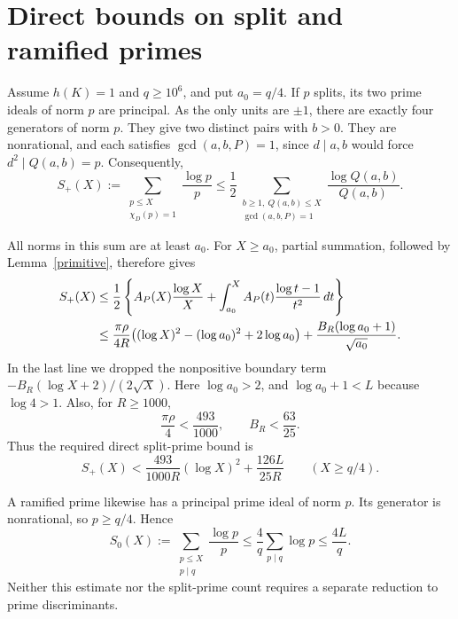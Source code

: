 \documentclass[11pt]{article}
\begin{document}
\section{Direct bounds on split and ramified primes}

Assume \(h(K)=1\) and \(q\ge10^6\), and put \(a_0=q/4\).
If \(p\) splits, its two prime ideals of norm \(p\) are principal.
As the only units are \(\pm1\), there are exactly four generators
of norm \(p\). They give two distinct pairs with \(b>0\).
They are nonrational, and each satisfies \(\gcd(a,b,P)=1\), since
\(d\mid a,b\) would force \(d^2\mid Q(a,b)=p\).
Consequently,
\begin{equation}\label{split-count}
 S_+(X):=\sum_{\substack{p\le X\\\chi_D(p)=1}}\frac{\log p}{p}
 \le\frac12\sum_{\substack{b\ge1,\ Q(a,b)\le X\\\gcd(a,b,P)=1}}
                        \frac{\log Q(a,b)}{Q(a,b)}.
\end{equation}

All norms in this sum are at least \(a_0\). For \(X\ge a_0\),
partial summation, followed by Lemma~\ref{primitive}, therefore gives
\begin{align}
 S_+(X)
 &\le\frac12\left\{
 A_P(X)\frac{\log X}{X}
 +\int_{a_0}^X A_P(t)\frac{\log t-1}{t^2}\,dt\right\} \notag\\
 &\le\frac{\pi\rho}{4R}
       \bigl((\log X)^2-(\log a_0)^2+2\log a_0\bigr)
   +\frac{B_R(\log a_0+1)}{\sqrt{a_0}}.\label{split-precise}
\end{align}
In the last line we dropped the nonpositive boundary term
\(-B_R(\log X+2)/(2\sqrt X)\).
Here \(\log a_0>2\), and \(\log a_0+1<L\) because \(\log4>1\).
Also, for \(R\ge1000\),
\[
 \frac{\pi\rho}{4}<\frac{493}{1000},\qquad B_R<\frac{63}{25}.
\]
Thus the required direct split-prime bound is
\begin{equation}\label{split-final}
 S_+(X)<\frac{493}{1000R}(\log X)^2+\frac{126L}{25R}
             \qquad(X\ge q/4).
\end{equation}

A ramified prime likewise has a principal prime ideal of norm \(p\).
Its generator is nonrational, so \(p\ge q/4\). Hence
\begin{equation}\label{ramified}
 S_0(X):=\sum_{\substack{p\le X\\p\mid q}}\frac{\log p}{p}
 \le\frac4q\sum_{p\mid q}\log p\le\frac{4L}{q}.
\end{equation}
Neither this estimate nor the split-prime count requires a separate
reduction to prime discriminants.
\end{document}

